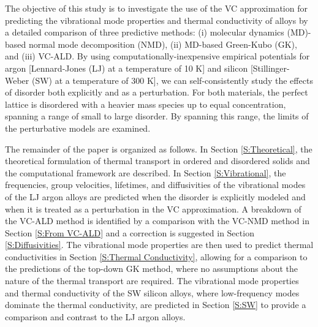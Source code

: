 The objective of this study is to investigate the use of the VC 
approximation for predicting the vibrational mode properties and 
thermal conductivity of alloys by a detailed comparison 
of three predictive methods: (i) molecular dynamics (MD)-based 
normal mode decomposition (NMD), (ii) MD-based Green-Kubo (GK), 
and (iii) VC-ALD. By using computationally-inexpensive  
empirical potentials for argon [Lennard-Jones (LJ) at a temperature of 10 K]
\cite{ashcroft_solid_1976} 
and silicon [Stillinger-Weber (SW) at a temperature of 300 K],
\cite{stillinger_computer_1985}   
we can self-consistently study the effects of disorder both explicitly 
and as a perturbation. For both materials, the perfect lattice is 
disordered with a heavier mass species up to equal 
concentration, spanning 
a range of small to large disorder. By spanning this range, 
the limits of the perturbative models are examined.

The remainder of the paper is organized as follows. 
In Section \ref{S:Theoretical}, the theoretical 
formulation of thermal transport in ordered and disordered solids 
and the computational framework are described. 
In Section \ref{S:Vibrational}, the frequencies, 
group velocities, lifetimes, and diffusivities of the 
vibrational modes of the LJ argon alloys are 
predicted when the disorder is explicitly modeled and when it is 
treated as a perturbation in the VC approximation. 
A breakdown of the VC-ALD method is identified by a comparison 
with the VC-NMD method in 
Section \ref{S:From VC-ALD}   
and a correction is suggested in Section \ref{S:Diffusivities}. 
The vibrational 
mode properties are then used to predict thermal conductivities 
in Section \ref{S:Thermal Conductivity}, 
allowing for a comparison to the predictions of the top-down  
GK method, where no assumptions about the nature of the 
thermal transport are required. The vibrational mode properties and 
thermal conductivity of the SW silicon alloys, where low-frequency modes 
dominate the thermal conductivity, are predicted in 
Section \ref{S:SW} to provide a comparison and contrast to the 
LJ argon alloys. 



